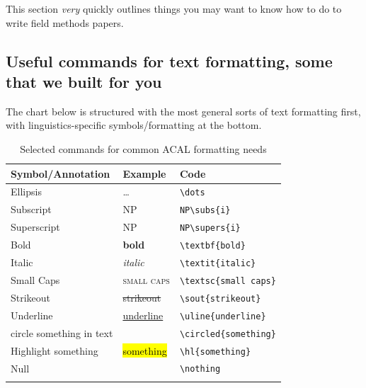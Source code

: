 \documentclass[output=paper,colorlinks,citecolor=brown]{langscibook}
\begin{document}
This section \textit{very} quickly outlines things you may want to know how to do to write field methods papers. 

\subsection{Useful commands for text formatting, some that we built for you}
 \label{sec:diercks:UsefulShortcuts}

The chart below is structured with the most general sorts of text formatting first, with linguistics-specific symbols/formatting at the bottom.

\begin{table}
\caption{Selected commands for common ACAL formatting needs}
\label{tab:diercks:CommandsTable}

\begin{tabular}[t]{l l l}
\lsptoprule		
\textbf{Symbol/Annotation} & \textbf{Example} & \textbf{Code} \\ \midrule
		Ellipsis & \dots & \verb|\dots| \\
		Subscript & NP\subs{i} & \verb|NP\subs{i}| \\
		Superscript & NP\supers{i} & \verb|NP\supers{i}|\\ 
		Bold & \textbf{bold} & \verb|\textbf{bold}| \\
		Italic & \textit{italic} & \verb|\textit{italic}| \\
		Small Caps & \textsc{small caps} & \verb|\textsc{small caps}| \\
		Strikeout & \sout{strikeout} & \verb|\sout{strikeout}| \\
		Underline & \uline{underline} & \verb|\uline{underline}| \\
		circle something in text & \circled{something} & \verb|\circled{something}| \\
		Highlight something & \hl{something} & \verb|\hl{something}| \\
		Null & \nothing  & \verb|\nothing|\\
	\lspbottomrule
	\end{tabular}
\end{table}
\end{document}
